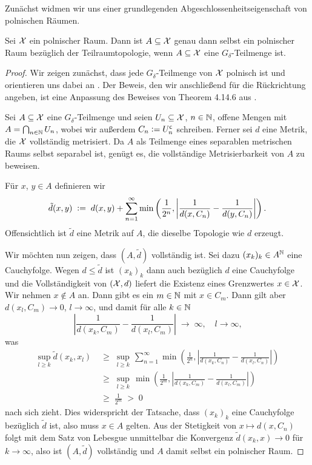 \documentclass[../thesis/thesis.tex]{subfiles}
\begin{document}
	Zunächst widmen wir uns einer grundlegenden Abgeschlossenheitseigenschaft von polnischen Räumen.
	
	\begin{Satz}[Alexandroff]
		\label{satz:alexandroff}
		Sei $\mathcal{X}$ ein polnischer Raum. Dann ist $A \subseteq \mathcal{X}$ genau dann selbst ein polnischer Raum bezüglich der Teilraumtopologie, 
		wenn $A \subseteq \mathcal{X}$ eine $G_\delta$-Teilmenge ist.
	\end{Satz}
	
	\begin{proof}
		Wir zeigen zunächst, dass jede $G_\delta$-Teilmenge von $\mathcal{X}$ polnisch ist und orientieren uns dabei an \cite[Theorem 7]{JordanBell.2014}. Der Beweis, den wir anschließend für 
		die Rückrichtung angeben, ist eine Anpassung des Beweises von Theorem 4.14.6 aus \cite[Section 4.14]{Simon.2015}.
		
		Sei $A \subseteq \mathcal{X}$ eine $G_\delta$-Teilmenge und seien 
		$U_n \subseteq \mathcal{X}$, $n \in \mathbb{N}$, offene Mengen mit 
		$A = \bigcap_{n \in \mathbb{N}} U_n$, wobei wir außerdem 
		$C_n \vcentcolon = U_n^{\mathsf{c}}$ schreiben. Ferner sei 
		$d$ eine Metrik, die $\mathcal{X}$ vollständig metrisiert. 
		Da $A$ als Teilmenge eines separablen metrischen Raums 
		selbst separabel ist, genügt es, die vollständige Metrisierbarkeit 
		von $A$ zu beweisen.
		
		Für $x$, $y \in A$ definieren wir
		\[\tilde{d}(x, y) \; \vcentcolon = \; d(x, y) + \sum_{n=1}^{\infty} \min \left(
		\frac{1}{2^n}, \left| \frac{1}{d(x, C_n)} - \frac{1}{d(y, C_n)} \right|
		\right) \text{.}\]
		Offensichtlich ist $\tilde{d}$ eine Metrik auf $A$, 
		die dieselbe Topologie wie $d$ erzeugt. 
		
		Wir möchten nun zeigen, dass $(A, \tilde{d})$ vollständig ist. 
		Sei dazu $(x_k)_k \in A^{\mathbb{N}}$ eine Cauchyfolge. Wegen $d \leq \tilde{d}$ 
		ist $(x_k)_k$ dann auch bezüglich $d$ eine Cauchyfolge und die 
		Vollständigkeit von $(\mathcal{X}, d)$ liefert die Existenz eines Grenzwertes 
		$x \in \mathcal{X}$. Wir nehmen $x \notin A$ an. Dann gibt es ein $m \in \mathbb{N}$ mit 
		$x \in C_m$. Dann gilt aber $d(x_l, C_m) \to 0$, $l \to \infty$, und damit für alle $k \in \mathbb{N}$
		$$ \left| \frac{1}{d(x_k, C_m)} -
		\frac{1}{d(x_l, C_m)} \right| \; \to \; \infty, \quad l \to \infty \text{,} $$
		was
		\begin{align*}
			\sup_{l \geq k} \tilde{d}(x_k, x_l) \; &\geq \; \sup_{l \geq k} \, \sum_{n=1}^{\infty} \min \left(\frac{1}{2^n}, \left| \frac{1}{d(x_k, C_n)} -\frac{1}{d(x_l, C_n)} \right|\right) \\
			                                       &\geq \; \sup_{l \geq k} \, \min \left(\frac{1}{2^m}, \left| \frac{1}{d(x_k, C_m)} -\frac{1}{d(x_l, C_m)} \right|\right) \\
												   &\geq \; \frac{1}{2^m} \; > \; 0
		\end{align*}
		nach sich zieht. Dies widerspricht der Tatsache, dass $(x_k)_k$ eine Cauchyfolge 
		bezüglich $\tilde{d}$ ist, also muss $x \in A$ gelten. 
		Aus der Stetigkeit von $x \mapsto d(x, C_n)$ folgt mit dem 
		Satz von Lebesgue unmittelbar die Konvergenz 
		$\tilde{d}(x_k, x) \to 0$ für $k \to \infty$,
		also ist $(A, \tilde{d})$ vollständig und $A$ damit selbst ein
		polnischer Raum.
		

\end{proof}
\end{document}
